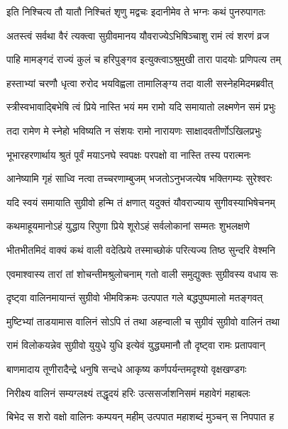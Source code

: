 \twolineshloka
{इति निश्चित्य तौ यातौ निश्चितं शृणु मद्वचः}
{इदानीमेव ते भग्नः कथं पुनरुपागतः} %

\twolineshloka
{अतस्त्वं सर्वथा वैरं त्यक्त्वा सुग्रीवमानय}
{यौवराज्येऽभिषिञ्चाशु रामं त्वं शरणं व्रज} %

\twolineshloka
{पाहि मामङ्गदं राज्यं कुलं च हरिपुङ्गव}
{इत्युक्त्वाऽश्रुमुखी तारा पादयोः प्रणिपत्य तम्} %

\twolineshloka
{हस्ताभ्यां चरणौ धृत्वा रुरोद भयविह्वला}
{तामालिङ्ग्य तदा वाली सस्नेहमिदमब्रवीत्} %

\twolineshloka
{स्त्रीस्वभावाद्बिभेषि त्वं प्रिये नास्ति भयं मम}
{रामो यदि समायातो लक्ष्मणेन समं प्रभुः} %

\twolineshloka
{तदा रामेण मे स्नेहो भविष्यति न संशयः}
{रामो नारायणः साक्षादवतीर्णोऽखिलप्रभुः} %

\twolineshloka
{भूभारहरणार्थाय श्रुतं पूर्वं मयाऽनघे}
{स्वपक्षः परपक्षो वा नास्ति तस्य परात्मनः} %

\twolineshloka
{आनेष्यामि गृहं साध्वि नत्वा तच्चरणाम्बुजम्}
{भजतोऽनुभजत्येष भक्तिगम्यः सुरेश्वरः} %

\twolineshloka
{यदि स्वयं समायाति सुग्रीवो हन्मि तं क्षणात्}
{यदुक्तं यौवराज्याय सुगीवस्याभिषेचनम्} %

\twolineshloka
{कथमाहूयमानोऽहं युद्धाय रिपुणा प्रिये}
{शूरोऽहं सर्वलोकानां सम्मतः शुभलक्षणे} %

\twolineshloka
{भीतभीतमिदं वाक्यं कथं वाली वदेत्प्रिये}
{तस्माच्छोकं परित्यज्य तिष्ठ सुन्दरि वेश्मनि} %

\twolineshloka
{एवमाश्वास्य तारां तां शोचन्तीमश्रुलोचनाम्}
{गतो वाली समुद्युक्तः सुग्रीवस्य वधाय सः} %

\twolineshloka
{दृष्ट्वा वालिनमायान्तं सुग्रीवो भीमविक्रमः}
{उत्पपात गले बद्धपुष्पमालो मतङ्गवत्} %

\twolineshloka
{मुष्टिभ्यां ताडयामास वालिनं सोऽपि तं तथा}
{अहन्वाली च सुग्रीवं सुग्रीवो वालिनं तथा} %

\twolineshloka
{रामं विलोकयन्नेव सुग्रीवो युयुधे युधि}
{इत्येवं युद्ध्यमानौ तौ दृष्ट्वा रामः प्रतापवान्} %

\twolineshloka
{बाणमादाय तूणीरादैन्द्रे धनुषि सन्दधे}
{आकृष्य कर्णपर्यन्तमदृश्यो वृक्षखण्डगः} %

\twolineshloka
{निरीक्ष्य वालिनं सम्यग्लक्ष्यं तद्धृदयं हरिः}
{उत्ससर्जाशनिसमं महावेगं महाबलः} %

\twolineshloka
{बिभेद स शरो वक्षो वालिनः कम्पयन् महीम्}
{उत्पपात महाशब्दं मुञ्चन् स निपपात ह} %

